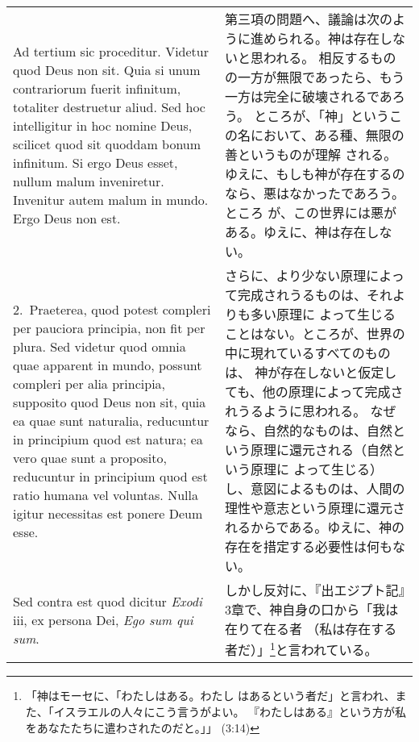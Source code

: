 \documentclass[10pt]{jsarticle}
\begin{document}
\begin{longtable}{p{21em}p{21em}}

{\Huge A}{\sc d tertium sic proceditur}. Videtur quod Deus
non sit. Quia si unum contrariorum fuerit infinitum, totaliter
destruetur aliud. Sed hoc intelligitur in hoc nomine Deus, scilicet quod
sit quoddam bonum infinitum. Si ergo Deus esset, nullum malum
inveniretur. Invenitur autem malum in mundo. Ergo Deus non est.

&

第三項の問題へ、議論は次のように進められる。神は存在しないと思われる。
相反するものの一方が無限であったら、もう一方は完全に破壊されるであろう。
ところが、「神」というこの名において、ある種、無限の善というものが理解
される。ゆえに、もしも神が存在するのなら、悪はなかったであろう。ところ
が、この世界には悪がある。ゆえに、神は存在しない。

\\

2.~{\sc  Praeterea}, quod potest compleri per pauciora
principia, non fit per plura. Sed videtur quod omnia quae apparent in
mundo, possunt compleri per alia principia, supposito quod Deus non sit,
quia ea quae sunt naturalia, reducuntur in principium quod est natura;
ea vero quae sunt a proposito, reducuntur in principium quod est ratio
humana vel voluntas. Nulla igitur necessitas est ponere Deum esse.

&

さらに、より少ない原理によって完成されうるものは、それよりも多い原理に
よって生じることはない。ところが、世界の中に現れているすべてのものは、
神が存在しないと仮定しても、他の原理によって完成されうるように思われる。
なぜなら、自然的なものは、自然という原理に還元される（自然という原理に
よって生じる）し、意図によるものは、人間の理性や意志という原理に還元さ
れるからである。ゆえに、神の存在を措定する必要性は何もない。

\\

{\sc Sed contra est} quod dicitur {\it Exodi} {\sc iii}, ex
persona Dei, {\it Ego sum qui sum}.

&

しかし反対に、『出エジプト記』3章で、神自身の口から「我は在りて在る者
（私は存在する者だ）」\footnote{「神はモーセに、「わたしはある。わたし
はあるという者だ」と言われ、また、「イスラエルの人々にこう言うがよい。
『わたしはある』という方が私をあなたたちに遣わされたのだと。」」
(3:14)}と言われている。

\\


\end{longtable}
\end{document}
